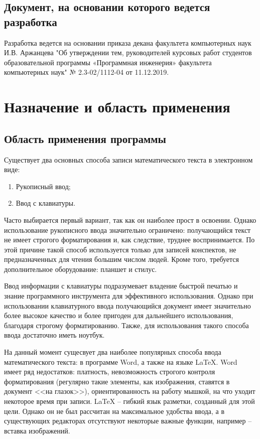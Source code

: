 \documentclass[explnote]{espd}
\begin{document}
\subsection{Документ, на основании которого ведется разработка}
Разработка ведется на основании приказа декана факультета компьютерных наук И.В. Аржанцева "Об утверждении тем, руководителей курсовых работ студентов образовательной программы «Программная инженерия» факультета компьютерных наук" № 2.3-02/1112-04 от 11.12.2019.

\section{Назначение и область применения}
\subsection{Область применения программы}
Существует два основных способа записи математического текста в электронном виде:

\begin{enumerate}
\item Рукописный ввод;
\item Ввод с клавиатуры.
\end{enumerate}

Часто выбирается первый вариант, так как он наиболее прост в освоении. Однако использование рукописного ввода значительно ограничено: получающийся текст не имеет строгого форматирования и, как следствие, труднее воспринимается. По этой причине такой способ используется только для записей конспектов, не предназначенных для чтения большим числом людей. Кроме того, требуется дополнительное оборудование: планшет и стилус.

Ввод информации с клавиатуры подразумевает владение быстрой печатью и знание программного инструмента для эффективного использования. Однако при использовании клавиатурного ввода получающийся документ имеет значительно более высокое качество и более пригоден для дальнейшего использования, благодаря строгому форматированию. Также, для использования такого способа ввода достаточно иметь ноутбук.

На данный момент сущесвует два наиболее популярных способа ввода математического текста: в программе Word, а также на языке LaTeX. Word имеет ряд недостатков: платность, невозможность строгого контроля форматирования (регулярно такие элементы, как изображения, ставятся в документ <<на глазок>>), ориентированность на работу мышкой, на что уходит некоторое время при записи. LaTeX -- гибкий язык разметки, созданный для этой цели. Однако он не был рассчитан на максимальное удобства ввода, а в существующих редакторах отсутствуют некоторые важные функции, например -- вставка изображений.
\end{document}
